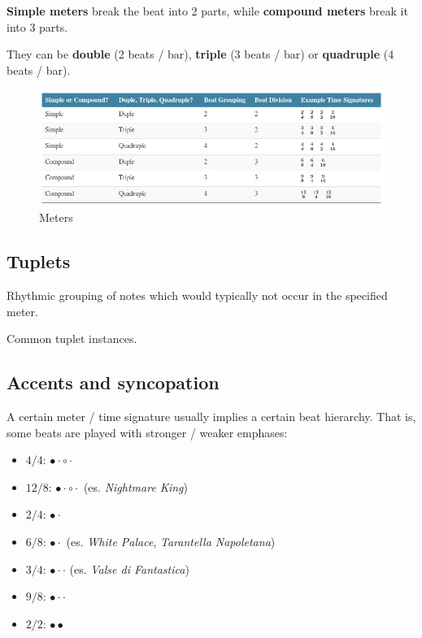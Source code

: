 \textbf{Simple meters} break the beat into 2 parts, while \textbf{compound meters} break it into 3 parts.

They can be \textbf{double} (2 beats / bar), \textbf{triple} (3 beats / bar) or \textbf{quadruple} (4 beats / bar).

\begin{figure}[h]
    \begin{center}
        \includegraphics[width=1\textwidth]{img/meters}
        \caption{Meters}
    \end{center}
\end{figure}

\subsection{Tuplets}
\begin{definition}[Tuplet]
    Rhythmic grouping of notes which would typically not occur in the specified meter.
\end{definition}

\begin{definition}
    Common tuplet instances.
\end{definition}

\subsection{Accents and syncopation}
A certain meter / time signature usually implies a certain beat hierarchy. That is, some beats are played with stronger / weaker emphases:
\begin{itemize}
    \item $4/4$: $\bullet \cdot \circ \cdot$
    \item $12/8$: $\bullet \cdot \circ \cdot$ (es. \emph{Nightmare King})
    \item $2/4$: $\bullet \cdot$
    \item $6/8$: $\bullet \cdot$ (es. \emph{White Palace}, \emph{Tarantella Napoletana})
    \item $3/4$: $\bullet \cdot \cdot$ (es. \emph{Valse di Fantastica})
    \item $9/8$: $\bullet \cdot \cdot$
    \item $2/2$: $\bullet \bullet$
\end{itemize}

